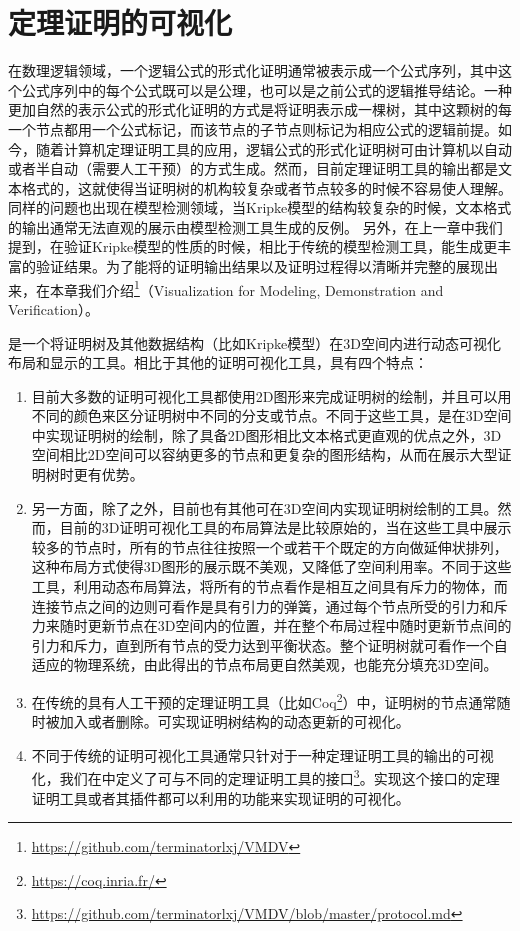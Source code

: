\chapter{定理证明的可视化}
在数理逻辑领域，一个逻辑公式的形式化证明通常被表示成一个公式序列，其中这个公式序列中的每个公式既可以是公理，也可以是之前公式的逻辑推导结论。一种更加自然的表示公式的形式化证明的方式是将证明表示成一棵树，其中这颗树的每一个节点都用一个公式标记，而该节点的子节点则标记为相应公式的逻辑前提。如今，随着计算机定理证明工具的应用，逻辑公式的形式化证明树可由计算机以自动或者半自动（需要人工干预）的方式生成。然而，目前定理证明工具的输出都是文本格式的，这就使得当证明树的机构较复杂或者节点较多的时候不容易使人理解。同样的问题也出现在模型检测领域，当Kripke模型的结构较复杂的时候，文本格式的输出通常无法直观的展示由模型检测工具生成的反例。
另外，在上一章中我们提到，\sctlprov{}在验证Kripke模型的性质的时候，相比于传统的模型检测工具，能生成更丰富的验证结果。为了能将\sctlprov{}的证明输出结果以及证明过程得以清晰并完整的展现出来，在本章我们介绍\footnote{\url{https://github.com/terminatorlxj/VMDV}}（Visualization for Modeling, Demonstration and Verification）。

是一个将证明树及其他数据结构（比如Kripke模型）在3D空间内进行动态可视化布局和显示的工具。相比于其他的证明可视化工具，具有四个特点：
\begin{enumerate}
	\item 目前大多数的证明可视化工具\cite{byrnes2009visualizing,LibalRR14,sakurai2011mikibeta,steel2005visualising}都使用2D图形来完成证明树的绘制，并且可以用不同的颜色来区分证明树中不同的分支或节点。不同于这些工具，是在3D空间中实现证明树的绘制，除了具备2D图形相比文本格式更直观的优点之外，3D空间相比2D空间可以容纳更多的节点和更复杂的图形结构，从而在展示大型证明树时更有优势。
	\item 另一方面，除了之外，目前也有其他可在3D空间内实现证明树绘制的工具\cite{Farmer200939,bajaj2003interactive}。然而，目前的3D证明可视化工具的布局算法是比较原始的，当在这些工具中展示较多的节点时，所有的节点往往按照一个或若干个既定的方向做延伸状排列，这种布局方式使得3D图形的展示既不美观，又降低了空间利用率。不同于这些工具，利用动态布局算法，将所有的节点看作是相互之间具有斥力的物体，而连接节点之间的边则可看作是具有引力的弹簧，通过每个节点所受的引力和斥力来随时更新节点在3D空间内的位置，并在整个布局过程中随时更新节点间的引力和斥力，直到所有节点的受力达到平衡状态。整个证明树就可看作一个自适应的物理系统，由此得出的节点布局更自然美观，也能充分填充3D空间。
	\item 在传统的具有人工干预的定理证明工具（比如Coq\footnote{\url{https://coq.inria.fr/}}）中，证明树的节点通常随时被加入或者删除。可实现证明树结构的动态更新的可视化。
	\item 不同于传统的证明可视化工具通常只针对于一种定理证明工具的输出的可视化，我们在中定义了可与不同的定理证明工具的接口\footnote{\url{https://github.com/terminatorlxj/VMDV/blob/master/protocol.md}}。实现这个接口的定理证明工具或者其插件都可以利用的功能来实现证明的可视化。
\end{enumerate}


